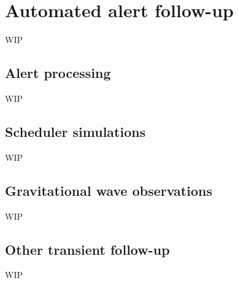 \section{Automated alert follow-up}
\label{sec:followup}
\begin{colsection}


\begin{colsection}

WIP

\end{colsection}


\subsection{Alert processing}
\label{sec:alerts}
\begin{colsection}

WIP

\end{colsection}


\subsection{Scheduler simulations}
\label{sec:simulations}
\begin{colsection}

WIP

\end{colsection}


\subsection{Gravitational wave observations}
\label{sec:gw_followup}
\begin{colsection}

WIP

\end{colsection}


\subsection{Other transient follow-up}
\label{sec:other_followup}
\begin{colsection}

WIP

\end{colsection}


\end{colsection}


